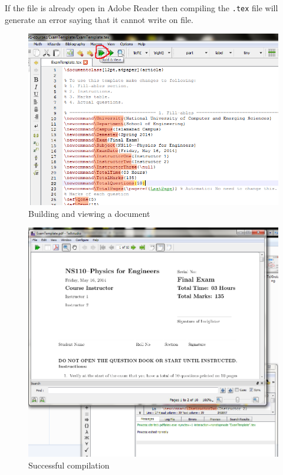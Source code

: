 \documentclass[12pt,a4paper]{article}
\begin{document}
If the file is already open in Adobe Reader then compiling the \verb|.tex| file will generate an error saying that it cannot write on file.
\begin{figure}[H]
\centering
\includegraphics[scale=0.675]{BuildandView.png}
\caption{Building and viewing a document}
\label{build-and-view}
\end{figure}
\begin{figure}[H]
\centering
\includegraphics[scale=0.6]{Compiled.png}
\caption{Successful compilation}
\label{compiled}
\end{figure}
\end{document}
